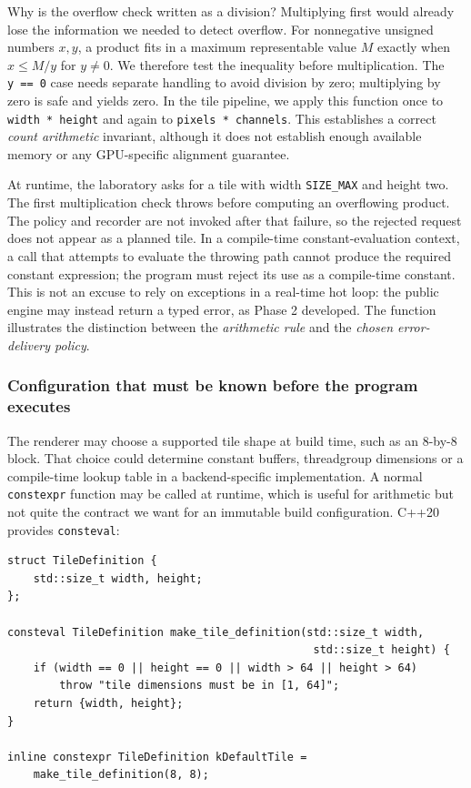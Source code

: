 Why is the overflow check written as a division? Multiplying first would already lose the information we needed to detect overflow. For nonnegative unsigned numbers \(x,y\), a product fits in a maximum representable value \(M\) exactly when \(x\le M/y\) for \(y\ne0\). We therefore test the inequality before multiplication. The \texttt{y\ ==\ 0} case needs separate handling to avoid division by zero; multiplying by zero is safe and yields zero. In the tile pipeline, we apply this function once to \texttt{width\ *\ height} and again to \texttt{pixels\ *\ channels}. This establishes a correct \emph{count arithmetic} invariant, although it does not establish enough available memory or any GPU-specific alignment guarantee.

At runtime, the laboratory asks for a tile with width \texttt{SIZE\_MAX} and height two. The first multiplication check throws before computing an overflowing product. The policy and recorder are not invoked after that failure, so the rejected request does not appear as a planned tile. In a compile-time constant-evaluation context, a call that attempts to evaluate the throwing path cannot produce the required constant expression; the program must reject its use as a compile-time constant. This is not an excuse to rely on exceptions in a real-time hot loop: the public engine may instead return a typed error, as Phase 2 developed. The function illustrates the distinction between the \emph{arithmetic rule} and the \emph{chosen error-delivery policy}.

\subsubsection{Configuration that must be known before the program executes}\label{configuration-that-must-be-known-before-the-program-executes}

The renderer may choose a supported tile shape at build time, such as an 8-by-8 block. That choice could determine constant buffers, threadgroup dimensions or a compile-time lookup table in a backend-specific implementation. A normal \texttt{constexpr} function may be called at runtime, which is useful for arithmetic but not quite the contract we want for an immutable build configuration. C++20 provides \texttt{consteval}:

\begin{verbatim}
struct TileDefinition {
    std::size_t width, height;
};

consteval TileDefinition make_tile_definition(std::size_t width,
                                               std::size_t height) {
    if (width == 0 || height == 0 || width > 64 || height > 64)
        throw "tile dimensions must be in [1, 64]";
    return {width, height};
}

inline constexpr TileDefinition kDefaultTile =
    make_tile_definition(8, 8);
\end{verbatim}


